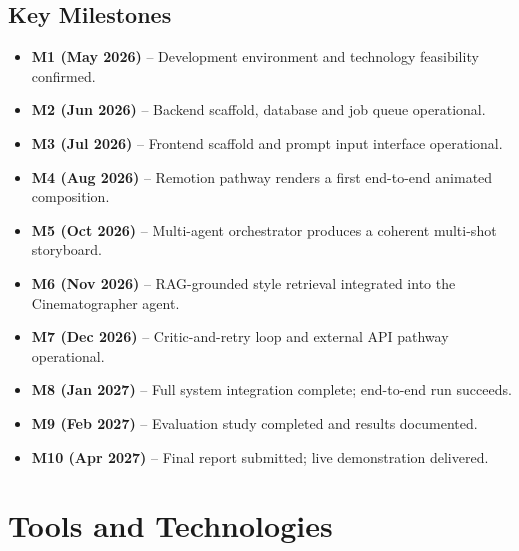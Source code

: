 \documentclass[11pt,a4paper]{article}
\begin{document}
\subsection*{Key Milestones}
\begin{itemize}[leftmargin=*]
\item \textbf{M1 (May 2026)} -- Development environment and technology feasibility confirmed.
\item \textbf{M2 (Jun 2026)} -- Backend scaffold, database and job queue operational.
\item \textbf{M3 (Jul 2026)} -- Frontend scaffold and prompt input interface operational.
\item \textbf{M4 (Aug 2026)} -- Remotion pathway renders a first end-to-end animated composition.
\item \textbf{M5 (Oct 2026)} -- Multi-agent orchestrator produces a coherent multi-shot storyboard.
\item \textbf{M6 (Nov 2026)} -- RAG-grounded style retrieval integrated into the Cinematographer agent.
\item \textbf{M7 (Dec 2026)} -- Critic-and-retry loop and external API pathway operational.
\item \textbf{M8 (Jan 2027)} -- Full system integration complete; end-to-end run succeeds.
\item \textbf{M9 (Feb 2027)} -- Evaluation study completed and results documented.
\item \textbf{M10 (Apr 2027)} -- Final report submitted; live demonstration delivered.
\end{itemize}

\needspace{0.5\textheight}
\section{Tools and Technologies}
\end{document}
